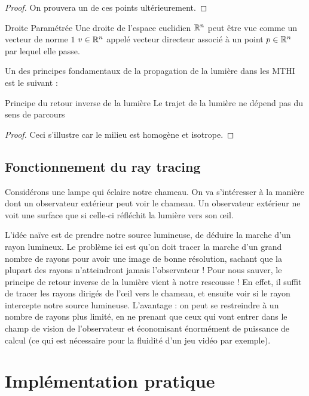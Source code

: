 \documentclass{classe}
\begin{document}
\begin{proof}
	On prouvera un de ces points ultérieurement.
\end{proof}
\begin{propositionfr}{Droite Paramétrée}{}
	Une droite de l'espace euclidien $\mathbb{R}^{n}$ peut être vue comme un vecteur de norme $1$ $v \in \mathbb{R}^{n}$ appelé vecteur directeur associé à un point $p \in \mathbb{R}^{n}$ par lequel elle passe.
\end{propositionfr}
Un des principes fondamentaux de la propagation de la lumière dans les MTHI est le suivant :
\begin{théorème}{Principe du retour inverse de la lumière}{}
Le trajet de la lumière ne dépend pas du sens de parcours
\end{théorème}
\begin{proof}
	Ceci s'illustre car le milieu est homogène et isotrope.
\end{proof}


\subsection{Fonctionnement du ray tracing}
Considérons une lampe qui éclaire notre chameau. On va s'intéresser à la manière dont un observateur extérieur peut voir le chameau.
Un observateur extérieur ne voit une surface que si celle-ci réfléchit la lumière vers son \oe il.

L'idée naïve est de prendre notre source lumineuse, de déduire la marche d'un rayon lumineux.
Le problème ici est qu'on doit tracer la marche d'un grand nombre de rayons pour avoir une image de bonne résolution, sachant que la plupart des rayons n'atteindront jamais l'observateur !
Pour nous sauver, le principe de retour inverse de la lumière vient à notre rescousse ! En effet, il suffit de tracer les rayons dirigés de l'\oe il vers le chameau, et ensuite voir si le rayon intercepte notre source lumineuse.
L'avantage : on peut se restreindre à un nombre de rayons plus limité, en ne prenant que ceux qui vont entrer dans le champ de vision de l'observateur et économisant énormément de puissance de calcul (ce qui est nécessaire pour la fluidité d'un jeu vidéo par exemple).

\section{Implémentation pratique}
\end{document}
